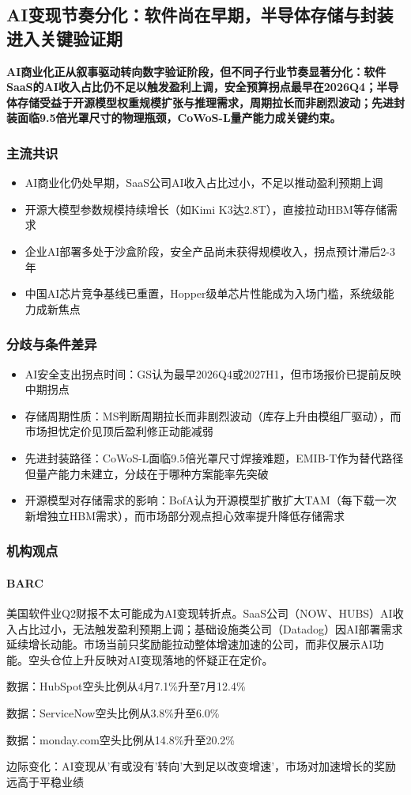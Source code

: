 \documentclass[11pt]{ctexart}
\begin{document}
\subsection{AI变现节奏分化：软件尚在早期，半导体存储与封装进入关键验证期}
\textbf{AI商业化正从叙事驱动转向数字验证阶段，但不同子行业节奏显著分化：软件SaaS的AI收入占比仍不足以触发盈利上调，安全预算拐点最早在2026Q4；半导体存储受益于开源模型权重规模扩张与推理需求，周期拉长而非剧烈波动；先进封装面临9.5倍光罩尺寸的物理瓶颈，CoWoS-L量产能力成关键约束。}
\subsubsection*{主流共识}
\begin{itemize}
  \item AI商业化仍处早期，SaaS公司AI收入占比过小，不足以推动盈利预期上调
  \item 开源大模型参数规模持续增长（如Kimi K3达2.8T），直接拉动HBM等存储需求
  \item 企业AI部署多处于沙盒阶段，安全产品尚未获得规模收入，拐点预计滞后2-3年
  \item 中国AI芯片竞争基线已重置，Hopper级单芯片性能成为入场门槛，系统级能力成新焦点
\end{itemize}
\subsubsection*{分歧与条件差异}
\begin{itemize}
  \item AI安全支出拐点时间：GS认为最早2026Q4或2027H1，但市场报价已提前反映中期拐点
  \item 存储周期性质：MS判断周期拉长而非剧烈波动（库存上升由模组厂驱动），而市场担忧定价见顶后盈利修正动能减弱
  \item 先进封装路径：CoWoS-L面临9.5倍光罩尺寸焊接难题，EMIB-T作为替代路径但量产能力未建立，分歧在于哪种方案能率先突破
  \item 开源模型对存储需求的影响：BofA认为开源模型扩散扩大TAM（每下载一次新增独立HBM需求），而市场部分观点担心效率提升降低存储需求
\end{itemize}
\subsubsection*{机构观点}
\paragraph{BARC} 美国软件业Q2财报不太可能成为AI变现转折点。SaaS公司（NOW、HUBS）AI收入占比过小，无法触发盈利预期上调；基础设施类公司（Datadog）因AI部署需求延续增长动能。市场当前只奖励能拉动整体增速加速的公司，而非仅展示AI功能。空头仓位上升反映对AI变现落地的怀疑正在定价。
{\small\color{refgray}数据：HubSpot空头比例从4月7.1\%升至7月12.4\%\par}
{\small\color{refgray}数据：ServiceNow空头比例从3.8\%升至6.0\%\par}
{\small\color{refgray}数据：monday.com空头比例从14.8\%升至20.2\%\par}
{\small\color{refgray}边际变化：AI变现从'有或没有'转向'大到足以改变增速'，市场对加速增长的奖励远高于平稳业绩\par}
\end{document}
